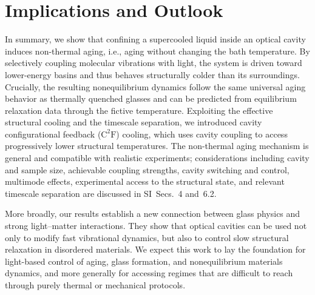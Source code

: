 \documentclass[aps, prl,
 reprint,
 superscriptaddress,
 citeautoscript,
 amsmath,amssymb,
 tightenlines
]{revtex4-2}
\begin{document}
\section*{Implications and Outlook}

In summary, we show that confining a supercooled liquid inside an optical cavity induces non-thermal aging, i.e., aging without changing the bath temperature. By selectively coupling molecular vibrations with light, the system is driven toward lower-energy basins and thus behaves structurally colder than its surroundings. Crucially, the resulting nonequilibrium dynamics follow the same universal aging behavior as thermally quenched glasses and can be predicted from equilibrium relaxation data through the fictive temperature. Exploiting the effective structural cooling and the timescale separation, we introduced cavity configurational feedback ($\mathrm{C^2F}$) cooling, which uses cavity coupling to access progressively lower structural temperatures. The non-thermal aging mechanism is general and compatible with realistic experiments; considerations including cavity and sample size, achievable coupling strengths, cavity switching and control, multimode effects, experimental access to the structural state, and relevant timescale separation are discussed in SI~Secs.~4 and~6.2.

More broadly, our results establish a new connection between glass physics and strong light--matter interactions. They show that optical cavities can be used not only to modify fast vibrational dynamics, but also to control slow structural relaxation in disordered materials. We expect this work to lay the foundation for light-based control of aging, glass formation, and nonequilibrium materials dynamics, and more generally for accessing regimes that are difficult to reach through purely thermal or mechanical protocols.

%
\end{document}
